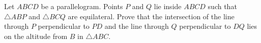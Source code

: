 Let $ABCD$ be a parallelogram. Points $P$ and $Q$ lie inside $ABCD$ such that $\bigtriangleup ABP$ and $\bigtriangleup{BCQ}$ are equilateral. Prove that the intersection of the line through $P$ perpendicular to $PD$ and the line through $Q$ perpendicular to $DQ$ lies on the altitude from $B$ in $\bigtriangleup{ABC}$.